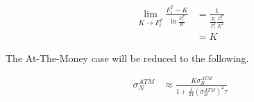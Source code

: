 \documentclass{article}
\begin{document}
\begin{align} \label{Transformation Limits Solution}
    \lim_{K \to F_t^T}{\frac{F_t^T - K}{\ln\frac{F_t^T}{K}}} &= \frac{1}{\frac{K}{F_t^T} \frac{F_t^T}{K^2}} \nonumber \\
    &= K
\end{align}

The At-The-Money case will be reduced to the following.

\begin{align}
    \sigma_N^{ATM} &\approx \frac{K \sigma_B^{ATM}}{1 +\frac{1}{24} \left(\sigma_B^{ATM}\right)^2 \tau}
\end{align}
\end{document}
